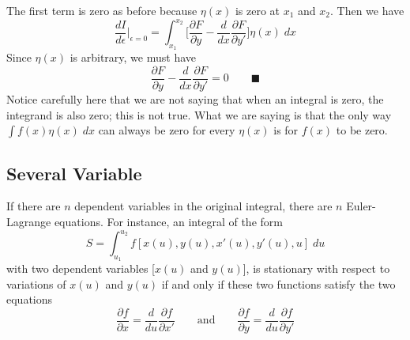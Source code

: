 \documentclass[../main.tex]{subfiles}
\begin{document}
The first term is zero as before because $\eta(x)$ is zero at $x_1$ and $x_2$. Then we have
\begin{equation*}
    \frac{dI}{d\epsilon}\bigg|_{\epsilon=0}=\int_{x_1}^{x_2}\biggl[\frac{\partial F}{\partial y}-\frac{d}{dx}\frac{\partial F}{\partial y'} \biggr] \eta(x)\;dx
\end{equation*}
Since $\eta(x)$ is arbitrary, we must have
\begin{equation*}
    \frac{\partial F}{\partial y}-\frac{d}{dx}\frac{\partial F}{\partial y'} =0\qquad \blacksquare
\end{equation*}
Notice carefully here that we are not saying that when an integral is zero, the integrand is also zero; this is not true. What we are saying is that the only way $\int f(x)\eta(x) \;dx$ can always be zero for 
every $\eta(x)$ is for $f(x)$ to be zero.

\subsection*{Several Variable}
If there are $n$ dependent variables in the original integral, there are $n$ Euler-Lagrange equations. For instance, an integral of the form
\begin{equation*}
    S=\int_{u_1}^{u_2}f[x(u),y(u),x'(u),y'(u),u]\;du
\end{equation*}
with two dependent variables [$x(u)$ and $y(u)$], is stationary with respect to variations of $x(u)$ and $y(u)$ if and only if these two functions satisfy the two equations
\begin{equation*}
    \frac{\partial f}{\partial x}=\frac{d}{du}\frac{\partial f}{\partial x'}\qquad\text{and} \qquad \frac{\partial f}{\partial y}=\frac{d}{du}\frac{\partial f}{\partial y'}
\end{equation*}
\end{document}

